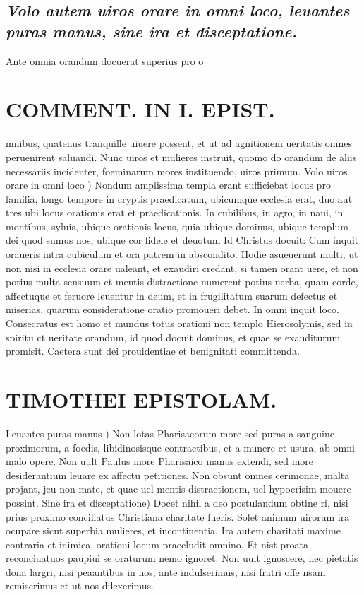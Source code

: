 \documentclass{article}
\begin{document}
\begin{pages}
\subsection*{\textit{Volo autem uiros orare in omni loco, leuantes puras manus, sine ira et disceptatione. }}\pstart Ante omnia orandum docuerat superius pro o\pend
\section*{COMMENT. IN I. EPIST. }
\marginpar{[ p.55 ]}\pstart mnibus, quatenus tranquille uiuere possent, et ut ad agnitionem ueritatis omnes peruenirent saluandi. Nunc uiros et mulieres instruit, quomo do orandum de aliis necessariis incidenter, foeminarum mores instituendo, uiros primum.  \pend\pstart Volo uiros orare in omni loco ) Nondum amplissima templa erant sufficiebat locus pro familia, longo tempore in cryptis praedicatum, ubicumque ecclesia erat, duo aut tres ubi locus orationis erat et praedicationis. In cubilibus, in agro, in naui, in montibus, syluis, ubique orationis locus, quia ubique dominus, ubique  templum dei quod sumus nos, ubique cor fidele et deuotum Id Christus docuit: Cum inquit oraueris intra cubiculum et ora patrem in abscondito. Hodie asueuerunt multi, ut non nisi in ecclesia orare ualeant, et exaudiri credant, si tamen orant uere, et non potius multa sensuum et mentis distractione numerent potius uerba, quam corde, affectuque et feruore leuentur in deum, et in frugilitatum suarum defectus et miserias, quarum eonsideratione oratio promoueri debet. In omni inquit loco. Consecratus est homo et mundus totus orationi non templo Hierosolymis, sed in spiritu ct ueritate orandum, id quod docuit dominus, et quae se exauditurum promisit. Caetera sunt dei prouidentiae et benignitati committenda.  \pend
\section*{TIMOTHEI EPISTOLAM. }
\marginpar{[ p.56 ]}\pstart Leuantes puras manus ) Non lotas Pharisaeorum more sed puras a sanguine proximorum, a foedis, libidinosisque contractibus, et a munere et usura, ab omni malo opere. Non uult Paulus more Pharisaico manus extendi, sed more desiderantium leuare ex affectu petitiones. Non obsunt omnes cerimonae, malta projant, jeu non mate, et quae uel mentis distractionem, uel hypocrisim mouere possint.  \pend\pstart Sine ira et disceptatione) Docet nihil a deo postulandum obtine ri, nisi prius proximo conciliatus Christiana charitate fueris. Solet animum uirorum ira ocupare sicut superbia mulieres, et incontinentia. Ira autem charitati maxime contraria et inimica, oratioui locum praecludit omnino. Et nist proata reconciuatuos paupiui se oraturum nemo ignoret. Non uult ignoscere, nec pietatis dona largri, nisi peaantibus in nos, ante indulserimus, nisi fratri offe nsam remiscrimus et ut nos dilexerimus.  \pend
{}
{}

\end{pages}
\end{document}
